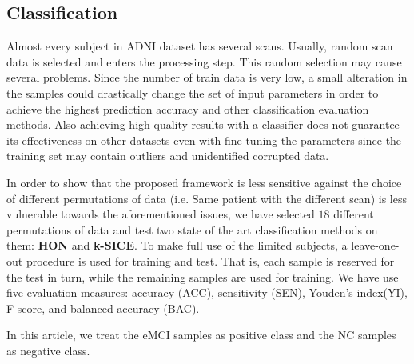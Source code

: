 \documentclass[preprint,12pt]{elsarticle}
\begin{document}
	\subsection{Classification}
	
	Almost every subject in ADNI dataset has several scans. Usually, random scan data is selected and enters the processing step\cite{r14}. This random selection may cause several problems. Since the number of train data is very low, a small alteration in the samples could drastically change the set of input parameters in order to achieve the highest prediction accuracy and other classification evaluation methods. Also achieving high-quality results with a classifier does not guarantee its effectiveness on other datasets even with fine-tuning the parameters since the training set may contain outliers and unidentified corrupted data.
	
	In order to show that the proposed framework is less sensitive against the choice of different permutations of data (i.e. Same patient with the different scan) is less vulnerable towards the aforementioned issues, we have selected $18$ different permutations of data and test two state of the art classification methods on them: \textbf{HON} and \textbf{k-SICE}.   
	To make full use of the limited subjects, a leave-one-out procedure is used for training and test. That is, each sample is reserved for the test in turn, while the remaining samples are used for training.
	We have use five
	evaluation measures: accuracy (ACC), sensitivity (SEN), Youden’s index(YI), F-score, and balanced accuracy (BAC)\cite{r65}.
	
	In this article, we treat the eMCI samples as positive class and the NC samples as negative class.
	
\end{document}
